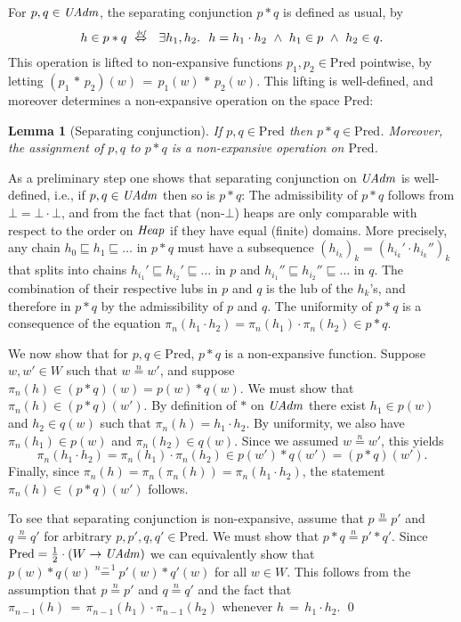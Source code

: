 \documentclass{LMCS}
\newtheorem{lemma}[theorem]{Lemma}
\theoremstyle{remark}
\newcommand{\defiff}{\ensuremath{\stackrel{\mbox{\tiny \it def}}{\Leftrightarrow}}}
\newcommand{\COMB}{\ensuremath{\cdot}}
\newcommand{\Pred}{\ensuremath{\mathrm{Pred}}\xspace}
\newcommand{\W}{\ensuremath{W}}
\newcommand{\nequiv}[1]{\ensuremath{\mathrel{\stackrel{#1}{=}}}}
\begin{document}
For $p,q\in\mathit{UAdm}$, the separating conjunction $p*q$ is defined as usual, by 
\begin{align*}
h \in p*q\ \defiff\ \ 
\exists h_1,h_2.\  \ h = h_1\COMB h_2\ \wedge\ h_1 \in p\ \wedge\ h_2\in q.
\end{align*}
This operation is lifted  to non-expansive functions $p_1,p_2\in\Pred$ pointwise, by letting 
$(p_1 \,{*}\, p_2)(w) \,=\, p_1(w) \,{*}\, p_2(w)$. 
This lifting is well-defined, and moreover determines a non-expansive operation on the space $\Pred$:
\begin{lemma}[Separating conjunction]
\label{lem:separation:non-expansiveness}
If $p,q\in\Pred$ then  $p*q\in\Pred$. Moreover, the assignment of $p, q$ to $p*q$ is a non-expansive operation on $\Pred$.
\end{lemma}
\proof
As a preliminary step one shows that separating conjunction on $\mathit{UAdm}$ is well-defined, i.e., if $p,q\in\mathit{UAdm}$ then so is $p*q$: 
The admissibility of $p*q$ follows from $\bot = \bot\COMB\bot$, and from the fact that (non-$\bot$) heaps are only comparable with   respect to the order on $\mathit{Heap}$ if they have equal (finite) domains. More precisely, any chain $h_0\sqsubseteq h_1\sqsubseteq\ldots$ in $p*q$ 
must have a subsequence $(h_{i_k})_k = (h_{i_k}'\COMB h_{i_k}'')_k$ that splits into chains $h_{i_1}'\sqsubseteq h_{i_2}'\sqsubseteq\ldots$  in $p$ and  $h_{i_1}''\sqsubseteq h_{i_2}''\sqsubseteq\ldots$  in $q$. The combination of their respective lubs in $p$ and $q$ is the lub of the $h_k$'s, and therefore in $p*q$ by the admissibility of $p$ and $q$. 
The uniformity of $p*q$ is a consequence of the equation $\pi_n(h_1\COMB h_2) = \pi_n(h_1)\COMB \pi_n(h_2)\in p*q$.
 
We now show that for $p,q\in\Pred$, $p*q$ is a non-expansive function. Suppose $w,w'\in\W$ such that $w\nequiv n w'$, and suppose $\pi_n(h)\in(p * q)(w)=p(w)*q(w)$. We must show that $\pi_n(h)\in (p * q)(w')$. 
By definition of $*$ on $\mathit{UAdm}$ there exist $h_1\in p(w)$ and $h_2\in q(w)$ such that $\pi_n(h)=h_1\COMB h_2$. 
By uniformity, we also have $\pi_n(h_1)\in p(w)$ and $\pi_n(h_2)\in q(w)$. 
Since we assumed $w\nequiv n w'$, this yields 
\[\pi_n(h_1\COMB h_2) = \pi_n(h_1)\COMB \pi_n(h_2)\in p(w')*q(w') = (p*q)(w').\] 
Finally, since $\pi_n(h) = \pi_n(\pi_n(h)) = \pi_n(h_1\COMB h_2)$, the statement $\pi_n(h)\in (p * q)(w')$ follows. 

To see that separating conjunction is non-expansive, assume that $p\nequiv n p'$ and $q\nequiv n q'$ for arbitrary $p,p',q,q'\in\Pred$. We must show that 
$p*q\nequiv n p'*q'$. Since $\Pred = \frac 1 2 \cdot(\W\to\UAdm)$ we can equivalently show that 
$p(w)*q(w)\nequiv {n-1} p'(w)*q'(w)$ for all $w\in\W$. 
This follows from the assumption that $p\nequiv{n}p'$
and $q\nequiv{n}q'$ and the fact that 
$\pi_{n{-}1}(h) \,{=}\, \pi_{n{-}1}(h_1)\COMB\pi_{n{-}1}(h_2)$ whenever $h\,{=}\,h_1\COMB h_2$. \qed
\end{document}

